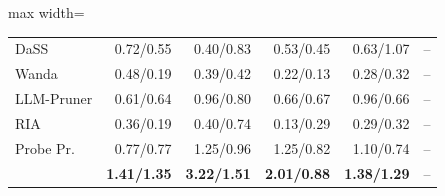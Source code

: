 \begin{table}[tbp]
\begin{adjustbox}{max width=\textwidth}
\begin{tabular}{lrrrrl}
DaSS & 0.72/0.55 & 0.40/0.83 & 0.53/0.45 & 0.63/1.07 & --\\
Wanda & 0.48/0.19 & 0.39/0.42 & 0.22/0.13 & 0.28/0.32 & --\\
LLM-Pruner & 0.61/0.64 & 0.96/0.80 & 0.66/0.67 & 0.96/0.66 & --\\
RIA & 0.36/0.19 & 0.40/0.74 & 0.13/0.29 & 0.29/0.32 & --\\
Probe Pr. & 0.77/0.77 & 1.25/0.96 & 1.25/0.82 & 1.10/0.74 & --\\
\rowcolor{SoftBlue}\textbf{\SubspacePath{}} & \textbf{1.41/1.35} & \textbf{3.22/1.51} & \textbf{2.01/0.88} & \textbf{1.38/1.29} & --\\
\bottomrule
\end{tabular}
\end{adjustbox}
\end{table}
